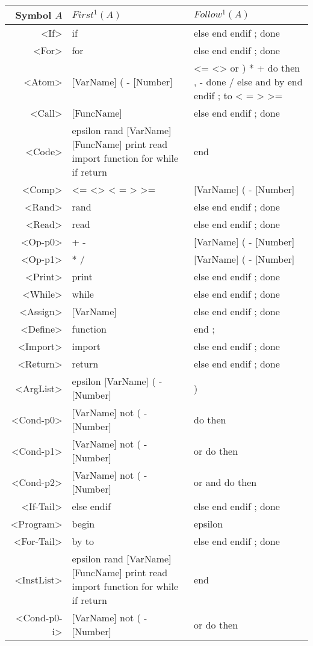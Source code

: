 \begin{longtable}{r p{7cm} p{7cm}}
\textnormal{Symbol} $A$ & $First^1(A)$ & $Follow^1(A)$\\ \hline
<If> & if  & else end endif ; done \\ \hline
<For> & for  & else end endif ; done \\ \hline
<Atom> & [VarName] ( - [Number]  & <= <> or ) * + do then , - done / else and by end endif ; to < = > >= \\ \hline
<Call> & [FuncName]  & else end endif ; done \\ \hline
<Code> & epsilon rand [VarName] [FuncName] print read import function for while if return  & end \\ \hline
<Comp> & <= <> < = > >=  & [VarName] ( - [Number] \\ \hline
<Rand> & rand  & else end endif ; done \\ \hline
<Read> & read  & else end endif ; done \\ \hline
<Op-p0> & + -  & [VarName] ( - [Number] \\ \hline
<Op-p1> & * /  & [VarName] ( - [Number] \\ \hline
<Print> & print  & else end endif ; done \\ \hline
<While> & while  & else end endif ; done \\ \hline
<Assign> & [VarName]  & else end endif ; done \\ \hline
<Define> & function  & end ; \\ \hline
<Import> & import  & else end endif ; done \\ \hline
<Return> & return  & else end endif ; done \\ \hline
<ArgList> & epsilon [VarName] ( - [Number]  & ) \\ \hline
<Cond-p0> & [VarName] not ( - [Number]  & do then \\ \hline
<Cond-p1> & [VarName] not ( - [Number]  & or do then \\ \hline
<Cond-p2> & [VarName] not ( - [Number]  & or and do then \\ \hline
<If-Tail> & else endif  & else end endif ; done \\ \hline
<Program> & begin  & epsilon \\ \hline
<For-Tail> & by to  & else end endif ; done \\ \hline
<InstList> & epsilon rand [VarName] [FuncName] print read import function for while if return  & end \\ \hline
<Cond-p0-i> & [VarName] not ( - [Number]  & or do then \\ \hline

\end{longtable}
